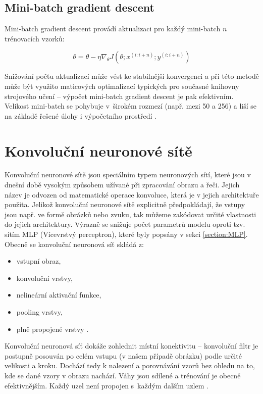 \subsection{Mini-batch gradient descent}
Mini-batch gradient descent provádí aktualizaci pro každý mini-batch $n$ trénovacích vzorků: 

\begin{equation} 
    \theta = \theta - \eta\nabla_{\theta}J(\theta;x^{(i:i+n)};y^{(i:i+n)})
    \end{equation} 

Snižování počtu aktualizací může vést ke stabilnější konvergenci a při této metodě může být využito maticových optimalizací typických pro současné knihovny strojového učení -- výpočet mini-batch gradient descent je pak efektivním. Velikost mini-batch se pohybuje v~širokém rozmezí (např. mezi 50 a 256) a liší se na základě řešené úlohy i výpočetního prostředí \cite{GradientDescent}. 



\section{Konvoluční neuronové sítě}
Konvoluční neuronové sítě jsou speciálním typem neuronových sítí, které jsou v dnešní době vysokým způsobem užívané při zpracování obrazu a řeči. Jejich název je odvozen od matematické operace konvoluce, která je v jejich architektuře použita. Jelikož konvoluční neuronové sítě explicitně předpokládají, že vstupy jsou např. ve formě obrázků nebo zvuku, tak můžeme zakódovat určité vlastnosti do jejich architektury. Výrazně se snižuje počet parametrů modelu oproti tzv. sítím MLP (Vícevrstvý perceptron), které byly popsány v sekci \ref{section:MLP}.\\

Obecně se konvoluční neuronová síť skládá z:
\begin{itemize}
    \item vstupní obraz,
    \item konvoluční vrstvy,
    \item nelineární aktivační funkce,
    \item pooling vrstvy,
    \item plně propojené vrstvy \cite{PoolingLayers}.
\end{itemize}

Konvoluční neuronová síť dokáže zohlednit místní konektivitu -- konvoluční filtr je postupně posouván po celém vstupu (v našem případě obrázku) podle určité velikosti a kroku. Dochází tedy k nalezení a porovnávání vzorů bez ohledu na to, kde se dané vzory v obrazu nachází. Váhy jsou sdílené a trénování je obecně efektivnějším. Každý uzel není propojen s~každým dalším uzlem \cite{CNNvsMLP}.

